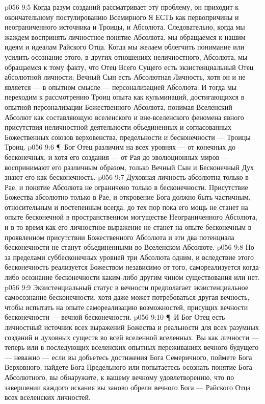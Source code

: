 \vs p056 9:5 Когда разум созданий рассматривает эту проблему, он приходит к окончательному постулированию Всемирного Я ЕСТЬ как первопричины и неограниченного источника и Троицы, и Абсолюта. Следовательно, когда мы жаждем воспринять личностное понятие Абсолюта, мы обращаемся к нашим идеям и идеалам Райского Отца. Когда мы желаем облегчить понимание или усилить осознание этого, в других отношениях неличностного, Абсолюта, мы обращаемся к тому факту, что Отец Всего Сущего есть экзистенциальный Отец абсолютной личности; Вечный Сын есть Абсолютная Личность, хотя он и не является --- в опытном смысле --- персонализацией Абсолюта. И тогда мы переходим к рассмотрению Троиц опыта как кульминаций, достигающихся в опытной персонализации Божественного Абсолюта, понимая Вселенский Абсолют как составляющую вселенского и вне\hyp{}вселенского феномена явного присутствия неличностной деятельности объединенных и согласованных Божественных союзов верховенства, предельности и бесконечности --- Троицы Троиц.
\vs p056 9:6 \P\ Бог Отец различим на всех уровнях --- от конечных до бесконечных, и хотя его создания --- от Рая до эволюционных миров --- воспринимают его различным образом, только Вечный Сын и Бесконечный Дух знают его как бесконечность.
\vs p056 9:7 Духовная личность абсолютна только в Рае, и понятие Абсолюта не ограничено только в бесконечности. Присутствие Божества абсолютно только в Рае, и откровение Бога должно быть частичным, относительным и постепенным всегда, до тех пор пока его мощь не станет на опыте бесконечной в пространственном могуществе Неограниченного Абсолюта, и в то время как его личностное выражение не станет на опыте бесконечным в проявленном присутствии Божественного Абсолюта и эти два потенциала бесконечности не станут объединенными во Вселенском Абсолюте.
\vs p056 9:8 Но за пределами суббесконечных уровней три Абсолюта  одним, и вследствие этого бесконечность реализуется Божеством независимо от того, самореализуется когда\hyp{}либо осознание бесконечности каким\hyp{}либо другим чином существования или нет.
\vs p056 9:9 Экзистенциальный статус в вечности предполагает экзистенциальное самосознание бесконечности, хотя даже может потребоваться другая вечность, чтобы испытать на опыте самореализацию возможностей, присущих вечности бесконечности --- вечной бесконечности.
\vs p056 9:10 \P\ И Бог Отец есть личностный источник всех выражений Божества и реальности для всех разумных созданий и духовных существ во всей вселенной вселенных. Вы как личности --- теперь или в последующих вселенских опытных переживаниях вечного будущего --- неважно --- если вы добьетесь достижения Бога Семеричного, поймете Бога Верховного, найдете Бога Предельного или попытаетесь осознать понятие Бога Абсолютного, вы обнаружите, к вашему вечному удовлетворению, что по завершении каждого искания вы заново обрели вечного Бога --- Райского Отца всех вселенских личностей.
